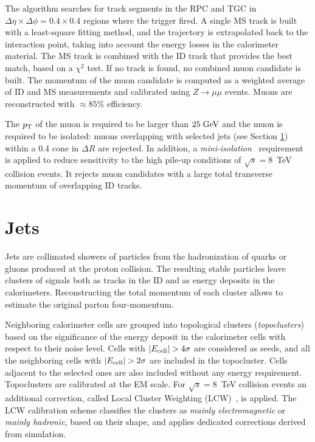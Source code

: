 The algorithm searches for track segments in the RPC and TGC in
$\Delta\eta\times\Delta\phi=0.4\times0.4$ regions where the trigger
fired. A single MS track is built with a least-square fitting method, and
the trajectory is extrapolated back to the interaction point, taking
into account the energy losses in the calorimeter material. 
The MS track is combined with the ID track that provides the best
match, based on a $\chi^2$ test. If no track is found, no combined
muon candidate is built.
The momentum of the muon candidate is computed as a weighted average
of ID and MS measurements and calibrated using $Z\to \mu\mu$ events.
Muons are reconstructed with \mbox{$\approx{}85\%$} efficiency.

The $p_{\mathrm{T}}$ of the muon is required to be larger than \mbox{$25 \; \mathrm{GeV}{}$}
and the muon is required to be isolated: muons overlapping with selected
jets (see Section \ref{sec:jets}) within a 0.4 cone in $\Delta R$ are
rejected. In addition, a {\it mini-isolation}~\cite{miniisolation}
requirement is applied to reduce sensitivity to the high pile-up
conditions of $\sqrt{s} = $8~TeV collision events. It rejects muon candidates
with a large total transverse momentum of overlapping ID tracks.

\section{Jets}
\label{sec:jets}

Jets are collimated showers of particles from the hadronization of
quarks or gluons produced at the proton collision.
The resulting stable particles leave clusters of signals both as
tracks in the ID and as energy deposits in the calorimeters.
Reconstructing the total momentum of each cluster allows to estimate
the original parton four-momentum.

Neighboring calorimeter cells are grouped into topological clusters
({\it topoclusters}) based on the significance of the energy deposit
in the calorimeter cells with respect to their noise
level. Cells with $|E_{\rm cell}|>4\sigma$ are considered as seeds, and
all the neighboring cells with $|E_{\rm cell}| > 2\sigma$ are included
in the topocluster. Cells adjacent to the selected ones are also
included without any energy requirement.
Topoclusters are calibrated at the EM scale. For $\sqrt{s} = $8~TeV
collision events an additional correction, called Local Cluster
Weighting (LCW)~\cite{lcwcalib}, is applied. The LCW calibration
scheme classifies the clusters as {\it mainly electromagnetic} or
{\it mainly hadronic}, based on their shape, and applies
dedicated corrections derived from simulation.

